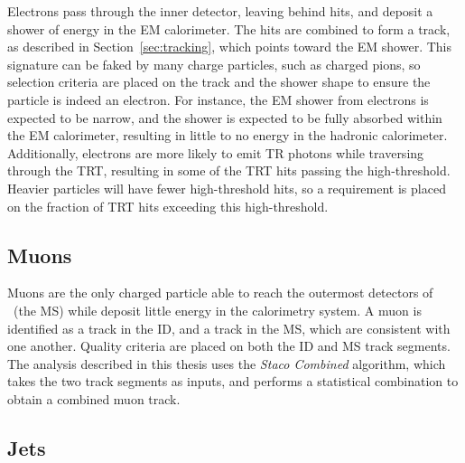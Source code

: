 Electrons pass through the inner detector, leaving behind hits, and deposit a
shower of energy in the EM calorimeter.
The hits are combined to form a track, as described in
Section~\ref{sec:tracking}, which points toward the EM shower.
This signature can be faked by many charge particles, such as charged pions, so
selection criteria are placed on the track and the shower shape to ensure the
particle is indeed an electron.
For instance, the EM shower from electrons is expected to be narrow, and the
shower is expected to be fully absorbed within the EM calorimeter, resulting in
little to no energy in the hadronic calorimeter.
Additionally, electrons are more likely to emit TR photons while traversing
through the TRT, resulting in some of the TRT hits passing the high-threshold.
Heavier particles will have fewer high-threshold hits, so a requirement is
placed on the fraction of TRT hits exceeding this high-threshold.

\FloatBarrier
\subsection{Muons} 
\label{sec:muons}

Muons are the only charged particle able to reach the outermost
detectors of \atlas\ (the MS) while deposit little energy in the calorimetry
system.
A muon is identified as a track in the ID, and a track in the MS, which are
consistent with one another.
Quality criteria are placed on both the ID and MS track segments.
The analysis described in this thesis uses the \textit{Staco Combined}
algorithm, which takes the two track segments as inputs, and performs
a statistical combination to obtain a combined muon track.

\FloatBarrier
\subsection{Jets} 
\label{sec:jets}

